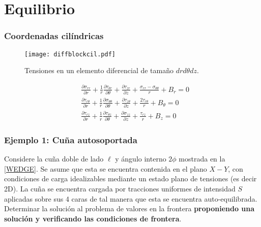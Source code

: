 \documentclass[../notas medios.tex]{subfiles}
\begin{document}
\chapter{Equilibrio}

\graphicspath{{img/Cap4/}} 								 %


\subsection*{Coordenadas cilíndricas}


\begin{figure}[H]
\centering
	\texttt{[image: diffblockcil.pdf]}
	\caption{Tensiones en un elemento diferencial de tamaño $dr{d\theta}dz$.}
	\label{diffcil}
\end{figure}

\begin{equation} \label{equcil}
\begin{split}
& \frac{{\partial {\sigma _{rr}}}}{{\partial r}} + \frac{1}{r}  \frac{{\partial {\tau _{{\theta}r}}}}{{\partial \theta}} + \frac{{\partial {\tau _{zr}}}}{{\partial z}} + \frac{\sigma _{rr} - \sigma _{{\theta}{\theta}}}{r} + {B_r} = 0 \\
& \frac{{\partial {\tau _{r{\theta}}}}}{{\partial r}} + \frac{1}{r} \frac{{\partial {\sigma _{{\theta}{\theta}}}}}{{\partial \theta}} + \frac{{\partial {\tau _{z{\theta}}}}}{{\partial z}} +  \frac{2 \tau_{r{\theta}}}{r} + {B_\theta} = 0 \\
& \frac{{\partial {\tau _{rz}}}}{{\partial r}} + \frac{1}{r} \frac{{\partial {\tau _{{\theta}z}}}}{{\partial \theta}} + \frac{{\partial {\sigma _{zz}}}}{{\partial z}} + \frac{ \tau_{rz}}{r} + {B_z} = 0 
\end{split}
\end{equation}

\subsection*{Ejemplo 1: Cuña autosoportada}

Considere la cuña doble de lado $\ell$ y ángulo interno $2 \phi$ mostrada en la \cref{WEDGE}. Se asume que esta se encuentra contenida en el plano $X-Y$, con condiciones de carga idealizables mediante un estado plano de tensiones (es decir 2D). La cuña se encuentra cargada por tracciones uniformes de intensidad $S$ aplicadas sobre sus 4 caras de tal manera que esta se encuentra auto-equilibrada. Determinar la solución al problema de valores en la frontera {\bf proponiendo una solución y verificando las condiciones de frontera}.
\end{document}
